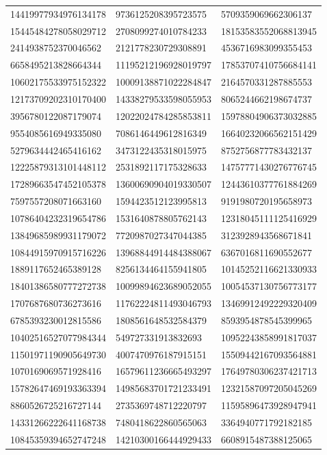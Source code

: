 \begin{longtable}{*{3}{l}}
14419977934976134178&9736125208395723575&5709359069662306137\\
15445484278058029712&2708099274010784233&18153583552068813945\\
2414938752370046562&2121778230729308891&4536716983099355453\\
6658495213828664344&11195212196928019797&17853707410756684141\\
10602175533975152322&10009138871022284847&2164570331287885553\\
12173709202310170400&14338279533598055953&8065244662198674737\\
3956780122087179074&12022024784285853811&15978804906373032885\\
9554085616949335080&7086146449612816349&16640232066562151429\\
5279634442465416162&3473122435318015975&8752756877783432137\\
12225879313101448112&2531892117175328633&14757771430276776745\\
17289663547452105378&13600690904019330507&12443610377761884269\\
7597557208071663160&1594423512123995813&9191980720195658973\\
10786404232319654786&1531640878805762143&12318045111125416929\\
13849685989931179072&7720987027347044385&3123928943568671841\\
10844915970915716226&13968844914484388067&6367016811690552677\\
1889117652465389128&8256134464155941805&10145252116621330933\\
18401386580777272738&10099894623689052055&10054537130756773177\\
1707687680736273616&11762224811493046793&13469912492229320409\\
6785393230012815586&1808561648532584379&8593954878545399965\\
10402516527077984344&549727331913832693&10952243858991817037\\
11501971190905649730&4007470976187915151&15509442167093564881\\
1070169069571928416&16579611236665493297&17649780306237421713\\
15782647469193363394&14985683701721233491&12321587097205045269\\
8860526725216727144&2735369748712220797&11595896473928947941\\
14331266222641168738&7480418622860565063&3364940771792182185\\
10845359394652747248&14210300166444929433&6608915487388125065\\

\end{longtable}
